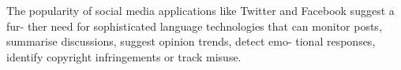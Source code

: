 \documentclass[]{../metanetpaper}
\begin{document}
The popularity of social media applications like Twitter and Facebook suggest a fur-
ther need for sophisticated language technologies that can monitor
posts, summarise discussions, suggest opinion trends, detect emo-
tional responses, identify copyright infringements or track misuse.
\end{document}
